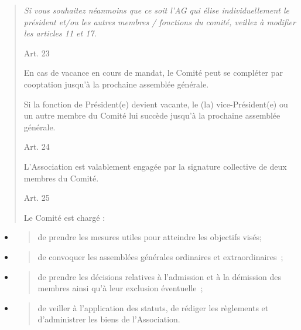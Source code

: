 \documentclass[
]{article}
\begin{document}
\begin{quote}
\emph{Si vous souhaitez néanmoins que ce soit l'AG qui élise
individuellement le président et/ou les autres membres / fonctions du
comité, veillez à modifier les articles 11 et 17.}

Art. 23~~~

En cas de vacance en cours de mandat, le Comité peut se compléter par
cooptation jusqu'à la prochaine assemblée générale.

Si la fonction de Président(e) devient vacante, le (la)
vice-Président(e) ou un autre membre du Comité lui succède jusqu'à la
prochaine assemblée générale.

Art. 24

L'Association est valablement engagée par la signature collective de
deux membres du Comité.

Art. 25

Le Comité est chargé :
\end{quote}

\begin{itemize}
\item
  \begin{quote}
  de prendre les mesures utiles pour atteindre les objectifs visés;
  \end{quote}
\item
  \begin{quote}
  de convoquer les assemblées générales ordinaires et extraordinaires~;
  \end{quote}
\item
  \begin{quote}
  de prendre les décisions relatives à l'admission et à la démission des
  membres ainsi qu'à leur exclusion éventuelle~;
  \end{quote}
\item
  \begin{quote}
  de veiller à l'application des statuts, de rédiger les règlements et
  d'administrer les biens de l'Association.
  \end{quote}
\end{itemize}
\end{document}
